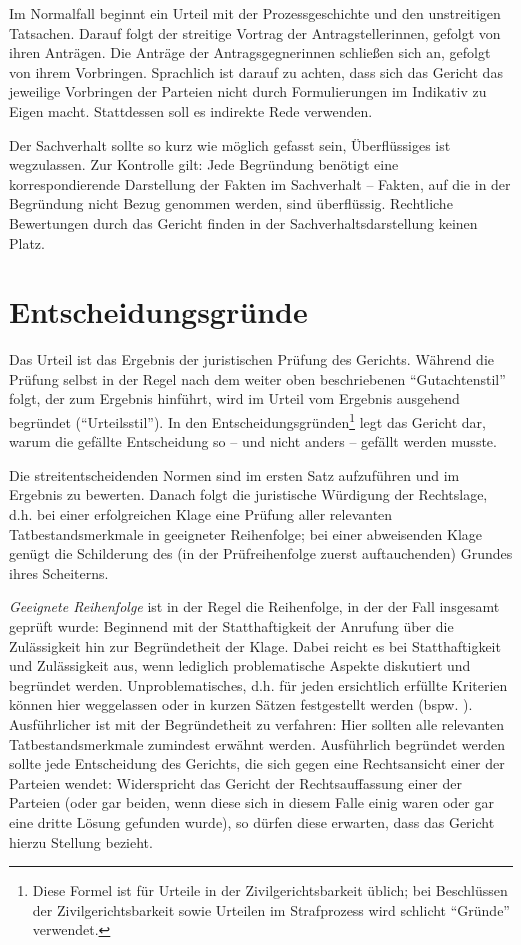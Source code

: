 Im Normalfall beginnt ein Urteil mit der Prozessgeschichte und den unstreitigen Tatsachen.
Darauf folgt der streitige Vortrag der Antragstellerinnen, gefolgt von ihren Anträgen.
Die Anträge der Antragsgegnerinnen schließen sich an, gefolgt von ihrem Vorbringen.
Sprachlich ist darauf zu achten, dass sich das Gericht das jeweilige Vorbringen der Parteien nicht durch Formulierungen im Indikativ zu Eigen macht.
Stattdessen soll es indirekte Rede verwenden.

Der Sachverhalt sollte so kurz wie möglich gefasst sein, Überflüssiges ist wegzulassen.
Zur Kontrolle gilt:
Jede Begründung benötigt eine korrespondierende Darstellung der Fakten im Sachverhalt – Fakten, auf die in der Begründung nicht Bezug genommen werden, sind überflüssig.
Rechtliche Bewertungen durch das Gericht finden in der Sachverhaltsdarstellung keinen Platz.

\section{Entscheidungsgründe}
Das Urteil ist das Ergebnis der juristischen Prüfung des Gerichts.
Während die Prüfung selbst in der Regel nach dem weiter oben beschriebenen \enquote{Gutachtenstil} folgt, der zum Ergebnis hinführt, wird im Urteil vom Ergebnis ausgehend begründet (\enquote{Urteilsstil}).
In den Entscheidungsgründen\footnote{Diese Formel ist für Urteile in der Zivilgerichtsbarkeit üblich; bei Beschlüssen der Zivilgerichtsbarkeit sowie Urteilen im Strafprozess wird schlicht \enquote{Gründe} verwendet.} legt das Gericht dar, warum die gefällte Entscheidung so – und nicht anders – gefällt werden musste.

Die streitentscheidenden Normen sind im ersten Satz aufzuführen und im Ergebnis zu bewerten.%
Danach folgt die juristische Würdigung der Rechtslage, d.h. bei einer erfolgreichen Klage eine Prüfung aller relevanten Tatbestandsmerkmale in geeigneter Reihenfolge; bei einer abweisenden Klage genügt die Schilderung des (in der Prüfreihenfolge zuerst auftauchenden) Grundes ihres Scheiterns.

\emph{Geeignete Reihenfolge} ist in der Regel die Reihenfolge, in der der Fall insgesamt geprüft wurde:
Beginnend mit der Statthaftigkeit der Anrufung über die Zulässigkeit hin zur Begründetheit der Klage.
Dabei reicht es bei Statthaftigkeit und Zulässigkeit aus, wenn lediglich problematische Aspekte diskutiert und begründet werden.
Unproblematisches, d.h. für jeden ersichtlich erfüllte Kriterien können hier weggelassen oder in kurzen Sätzen festgestellt werden (bspw. ).
Ausführlicher ist mit der Begründetheit zu verfahren:
Hier sollten alle relevanten Tatbestandsmerkmale zumindest erwähnt werden.
Ausführlich begründet werden sollte jede Entscheidung des Gerichts, die sich gegen eine Rechtsansicht einer der Parteien wendet:
Widerspricht das Gericht der Rechtsauffassung einer der Parteien (oder gar beiden, wenn diese sich in diesem Falle einig waren oder gar eine dritte Lösung gefunden wurde), so dürfen diese erwarten, dass das Gericht hierzu Stellung bezieht.

